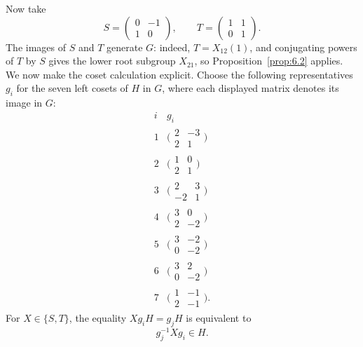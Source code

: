 \documentclass[../Odyssey_Project.tex]{subfiles}
\begin{document}
\begin{solution}
Now take
\[
    S=
    \begin{pmatrix}
        0  & -1\\
        1  & 0
    \end{pmatrix},
    \qquad
    T=
    \begin{pmatrix}
        1 & 1\\
        0 & 1
    \end{pmatrix}.
\]
The images of $S$ and $T$ generate $G$: indeed, $T=X_{12}(1)$, and conjugating powers of $T$ by $S$ gives the lower root subgroup $X_{21}$, so Proposition~\ref{prop:6.2} applies. We now make the coset calculation explicit. Choose the following representatives $g_i$ for the seven left cosets of $H$ in $G$, where each displayed matrix denotes its image in $G$:
\[
\begin{array}{c|c}
    i & g_i\\
    \hline
    1 & \bigl(\begin{smallmatrix}2&-3\\2&1\end{smallmatrix}\bigr)\\
    2 & \bigl(\begin{smallmatrix}1&0\\2&1\end{smallmatrix}\bigr)\\
    3 & \bigl(\begin{smallmatrix}2&3\\-2&1\end{smallmatrix}\bigr)\\
    4 & \bigl(\begin{smallmatrix}3&0\\2&-2\end{smallmatrix}\bigr)\\
    5 & \bigl(\begin{smallmatrix}3&-2\\0&-2\end{smallmatrix}\bigr)\\
    6 & \bigl(\begin{smallmatrix}3&2\\0&-2\end{smallmatrix}\bigr)\\
    7 & \bigl(\begin{smallmatrix}1&-1\\2&-1\end{smallmatrix}\bigr).
\end{array}
\]
For $X\in\{S,T\}$, the equality $Xg_iH=g_jH$ is equivalent to
\[
    g_j^{-1}Xg_i\in H.
\]
\end{solution}
\end{document}
